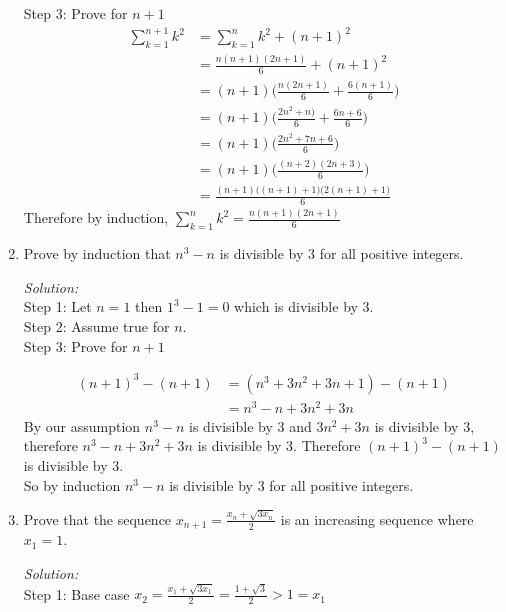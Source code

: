 \documentclass[12pt]{article}
\theoremstyle{remark}
\begin{document}
\begin{enumerate}
\begin{mdframed}[style=TheoremFrame]
Step 3: Prove for $n+1$
\begin{align*}
\sum_{k=1}^{n+1} k^2 &= \sum_{k=1}^{n} k^2 + (n+1)^2\\
&= \frac{n(n+1)(2n+1)}{6} + (n+1)^2\\
&= (n+1)\bigg( \frac{n(2n+1)}{6} + \frac{6(n+1)}{6}\bigg)\\
&= (n+1)\bigg( \frac{2n^2+n)}{6} + \frac{6n+6}{6}\bigg)\\
&= (n+1)\bigg( \frac{2n^2+7n+6}{6}\bigg)\\
&= (n+1)\bigg( \frac{(n+2)(2n+3)}{6}\bigg)\\
&= \frac{(n+1)\big((n+1)+1\big)\big(2(n+1)+1\big)}{6}
\end{align*}
Therefore by induction, $\displaystyle{\sum_{k=1}^n k^2 = \frac{n(n+1)(2n+1)}{6}}$
\end{mdframed}
\newpage
\item Prove by induction that $n^3-n$ is divisible by $3$ for all positive integers.
\begin{mdframed}[style=TheoremFrame]
\textit{Solution:}\\

Step 1: Let $n=1$ then $1^3 - 1 = 0$ which is divisible by $3$.\\

Step 2: Assume true for $n$.\\

Step 3: Prove for $n+1$

\begin{align*}
(n+1)^3 - (n+1) &= (n^3 + 3n^2 + 3n + 1) - (n+1)\\
&= n^3 -n + 3n^2 + 3n
\end{align*}
By our assumption $n^3-n$ is divisible by $3$ and $ 3n^2 + 3n$ is divisible by $3$, therefore $n^3 -n + 3n^2 + 3n$ is divisible by $3$. Therefore $(n+1)^3 - (n+1)$ is divisible by $3$.\\

So by induction $n^3-n$ is divisible by $3$ for all positive integers.
\end{mdframed}
\newpage
\item Prove that the sequence $\displaystyle{x_{n+1} = \frac{x_n + \sqrt{3x_n}}{2}}$ is an increasing sequence where $x_1 =1 $.
\begin{mdframed}[style=TheoremFrame]
\textit{Solution:}\\

Step 1: Base case $x_2 =\displaystyle{ \frac{x_1 + \sqrt{3x_1}}{2} = \frac{1+\sqrt{3}}{2} > 1 = x_1}$\\


\end{mdframed}
\end{enumerate}
\end{document}
